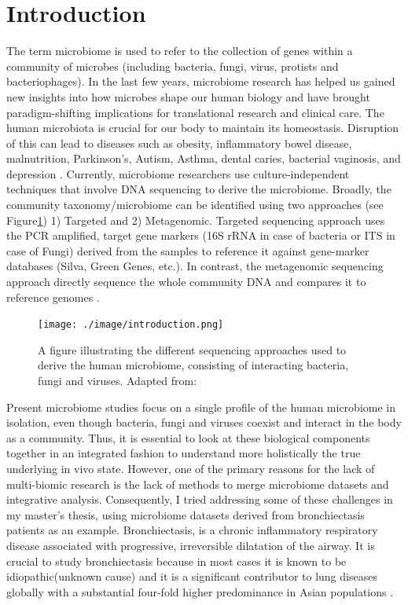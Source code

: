 \section{Introduction}

The term microbiome is used to refer to the collection of genes within a community of microbes (including bacteria, fungi, virus, protists and bacteriophages). In the last few years, microbiome research has helped us gained new insights into how microbes shape our human biology and have brought paradigm-shifting implications for translational research and clinical care. The human microbiota is crucial for our body to maintain its homeostasis. Disruption of this can lead to diseases such as obesity, inflammatory bowel disease, malnutrition, Parkinson's, Autism, Asthma, dental caries, bacterial vaginosis, and depression \cite{Knight2017}.  Currently, microbiome researchers use culture-independent techniques that involve DNA sequencing to derive the microbiome. Broadly, the community taxonomy/microbiome can be identified using two approaches (see Figure\ref{fig1}) 1) Targeted and 2) Metagenomic. Targeted sequencing approach uses the PCR amplified, target gene markers (16S rRNA in case of bacteria or ITS in case of Fungi) derived from the samples to reference it against gene-marker databases (Silva, Green Genes, etc.). In contrast, the metagenomic sequencing approach directly sequence the whole community DNA and compares it to reference genomes \cite{Morgan2012}.

\begin{figure}[ht]
	\centering
	\texttt{[image: ./image/introduction.png]}
	\caption{A figure illustrating the different sequencing approaches used to derive the human microbiome, consisting of interacting bacteria, fungi and viruses. Adapted from: \cite{Morgan2012}}
	\label{fig1}
\end{figure}

Present microbiome studies focus on a single profile of the human microbiome in isolation, even though bacteria, fungi and viruses coexist and interact in the body as a community. Thus, it is essential to look at these biological components together in an integrated fashion to understand more holistically the true underlying in vivo state. However, one of the primary reasons for the lack of multi-biomic research is the lack of methods to merge microbiome datasets and integrative analysis. Consequently, I tried addressing some of these challenges in my master's thesis, using microbiome datasets derived from bronchiectasis patients as an example. Bronchiectasis, is a chronic inflammatory respiratory disease associated with progressive, irreversible dilatation of the airway. It is crucial to study bronchiectasis because in most cases it is known to be idiopathic(unknown cause) \cite{pmid29478908} and it is a significant contributor to lung diseases globally with a substantial four-fold higher predominance in Asian populations \cite{Seitz2012}. 

